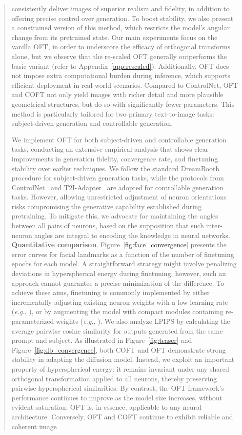 \begin{itemize}[leftmargin=*,nosep]
\begin{abstract}
consistently deliver images of superior realism and fidelity, in addition to offering precise control over generation. To boost stability, we also present a constrained version of this method, which restricts the model’s angular change from its pretrained state. Our main experiments focus on the vanilla OFT, in order to underscore the efficacy of orthogonal transforms alone, but we observe that the re-scaled OFT generally outperforms the basic variant (refer to Appendix~\ref{app:rescaled}). Additionally, OFT does not impose extra computational burden during inference, which supports efficient deployment in real-world scenarios. Compared to ControlNet, OFT and COFT not only yield images with richer detail and more plausible geometrical structures, but do so with significantly fewer parameters. This method is particularly tailored for two primary text-to-image tasks: subject-driven generation and controllable generation. \item We implement OFT for both subject-driven and controllable generation tasks, conducting an extensive empirical analysis that shows clear improvements in generation fidelity, convergence rate, and finetuning stability over earlier techniques. We follow the standard DreamBooth~\cite{ruiz2023dreambooth} procedure for subject-driven generation tasks, while the protocols from ControlNet~\cite{zhang2023adding} and T2I-Adapter~\cite{mou2023t2i} are adopted for controllable generation tasks. However, allowing unrestricted adjustment of neuron orientations risks compromising the generative capability established during pretraining. To mitigate this, we advocate for maintaining the angles between all pairs of neurons, based on the supposition that such inter-neuron angles are integral to encoding the knowledge in neural networks. \textbf{Quantitative comparison}. Figure~\ref{fig:face_convergence} presents the error curves for facial landmarks as a function of the number of finetuning epochs for each model. A straightforward strategy might involve penalizing deviations in hyperspherical energy during finetuning; however, such an approach cannot guarantee a precise minimization of the difference. To achieve these aims, finetuning is commonly implemented by either incrementally adjusting existing neuron weights with a low learning rate (\emph{e.g.}, \cite{ruiz2023dreambooth}), or by augmenting the model with compact modules containing re-parameterized weights (\emph{e.g.}, \cite{hulora2022,zhang2023adding}). We also analyze LPIPS by calculating the average pairwise cosine similarity for outputs generated from the same prompt and subject. As illustrated in Figure~\ref{fig:teaser} and Figure~\ref{fig:db_convergence}, both COFT and OFT demonstrate strong stability in adapting the diffusion model. Instead, we exploit an important property of hyperspherical energy: it remains invariant under any shared orthogonal transformation applied to all neurons, thereby preserving pairwise hyperspherical similarities. By contrast, the OFT framework’s performance continues to improve as the model size increases, without evident saturation. OFT is, in essence, applicable to any neural architecture. Conversely, OFT and COFT continue to exhibit reliable and coherent image 
\end{abstract}
\end{itemize}
